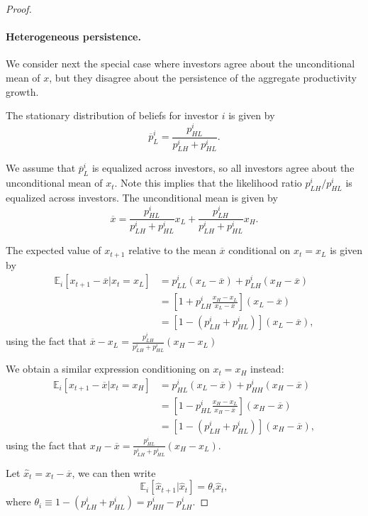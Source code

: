 \begin{proof}
\paragraph{Heterogeneous persistence.} We consider next the special case where investors agree about the unconditional mean of $x$, but they disagree about the persistence of the aggregate productivity growth. 

The stationary distribution of beliefs for investor $i$ is given by
\begin{equation}
    \overline{p}_L^i = \frac{p_{HL}^i}{p_{LH}^i+ p_{HL}^i}.
\end{equation}

We assume that $\overline{p}_L^i$ is equalized across investors, so all investors agree about the unconditional mean of $x_{t}$. Note this implies that the likelihood ratio $p_{LH}^i / p_{HL}^i$ is equalized across investors. The unconditional mean is given by
\begin{equation}
    \overline{x} = \frac{p_{HL}^i}{p_{LH}^i+p_{HL}^i} x_L + \frac{p_{LH}^i}{p_{LH}^i+p_{HL}^i} x_H.
\end{equation}

The expected value of $x_{t+1}$ relative to the mean $\overline{x}$ conditional on $x_t = x_L $ is given by
\begin{align}
    \mathbb{E}_i[x_{t+1} - \overline{x}|x_t = x_L] &= p_{LL}^i (x_L - \overline{x})+ p_{LH}^i (x_H - \overline{x})\\
    &= \left[1 +  p_{LH}^i \frac{x_H - x_L}{x_L - \overline{x}} \right](x_L - \overline{x})\\
    &= \left[1 - (p_{LH}^i +p_{HL}^i) \right](x_L - \overline{x}),
\end{align}
using the fact that $\overline{x} - x_L = \frac{p_{LH}^i}{p_{LH}^i+p_{HL}^i}(x_H-x_L)$

We obtain a similar expression conditioning on $x_t = x_H$ instead:
\begin{align}
    \mathbb{E}_i[x_{t+1} - \overline{x}|x_t = x_H] &= p_{HL}^i (x_L - \overline{x})+ p_{HH}^i (x_H - \overline{x})\\
    &= \left[1 -  p_{HL}^i \frac{x_H - x_L}{x_H - \overline{x}} \right](x_H - \overline{x})\\
    &= \left[1 - (p_{LH}^i +p_{HL}^i) \right](x_H - \overline{x}),
\end{align}
using the fact that $x_H - \overline{x} = \frac{p_{HL}^i}{p_{LH}^i+p_{HL}^i}(x_H-x_L)$.

Let $\hat{x}_{t} = x_t - \overline{x}$, we can then write
\begin{equation}
    \mathbb{E}_i[\hat{x}_{t+1}|\hat{x}_t] = \theta_i \hat{x}_t,
\end{equation}
where $\theta_i \equiv 1-  (p_{LH}^i +p_{HL}^i) = p_{HH}^i - p_{LH}^i$.


\end{proof}
